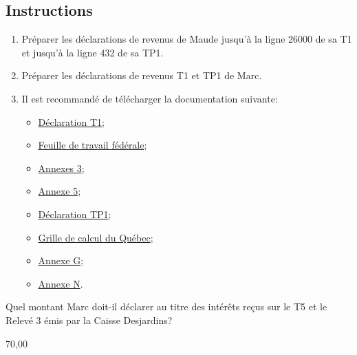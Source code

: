 \subsection{Instructions}
\begin{enumerate}
	\item Préparer les déclarations de revenus de Maude jusqu'à la ligne 26000 de sa T1 et jusqu'à la ligne 432 de sa TP1.
	\item Préparer les déclarations de revenus T1 et TP1 de Marc.
	\item Il est recommandé de télécharger la documentation suivante:
	\begin{itemize}
		\item \href{https://www.canada.ca/fr/agence-revenu/services/formulaires-publications/trousses-impot-toutes-annees-imposition/trousse-generale-impot-prestations/quebec/5005-r.html}{Déclaration T1};
		\item \href{https://www.canada.ca/fr/agence-revenu/services/formulaires-publications/trousses-impot-toutes-annees-imposition/trousse-generale-impot-prestations/5000-d1.html}{Feuille de travail fédérale};
		\item \href{https://www.canada.ca/fr/agence-revenu/services/formulaires-publications/trousses-impot-toutes-annees-imposition/trousse-generale-impot-prestations/5000-s3.html}{Annexes 3};
		\item \href{https://www.canada.ca/fr/agence-revenu/services/formulaires-publications/trousses-impot-toutes-annees-imposition/trousse-generale-impot-prestations/5000-s5.html}{Annexe 5};
		\item \href{https://www.revenuquebec.ca/documents/fr/formulaires/tp/2023-12/TP-1.D%282023-12%29.pdf}{Déclaration TP1};
		\item \href{https://www.revenuquebec.ca/documents/fr/formulaires/tp/2023-12/TP-1.D.GR%282023-12%29.pdf}{Grille de calcul du Québec};
		\item \href{https://www.revenuquebec.ca/documents/fr/formulaires/tp/2023-12/TP-1.D.G%282023-12%29.pdf}{Annexe G};
		\item \href{https://www.revenuquebec.ca/documents/fr/formulaires/tp/2023-12/TP-1.D.N%282023-12%29.pdf}{Annexe N}.
	\end{itemize}
\end{enumerate}

\setcounter{question}{0}
\begin{question}
	Quel montant Marc doit-il déclarer au titre des intérêts reçus sur le T5 et le Relevé 3 émis par la Caisse Desjardins?
\end{question}
70,00

